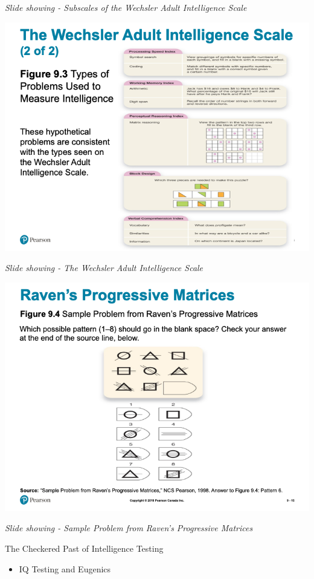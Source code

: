 \documentclass[
]{book}
\providecommand{\tightlist}{%
  \setlength{\itemsep}{0pt}\setlength{\parskip}{0pt}}
\begin{document}
\begin{reflect}
\emph{Slide showing - Subscales of the Wechsler Adult Intelligence Scale}

\includegraphics{assets/unit_2/slide_14.png}

\emph{Slide showing - The Wechsler Adult Intelligence Scale}

\includegraphics{assets/unit_2/slide_15.png}

\emph{Slide showing - Sample Problem from Raven's Progressive Matrices}

The Checkered Past of Intelligence Testing

\begin{itemize}
\tightlist
\item
  IQ Testing and Eugenics


\end{itemize}
\end{reflect}
\end{document}
